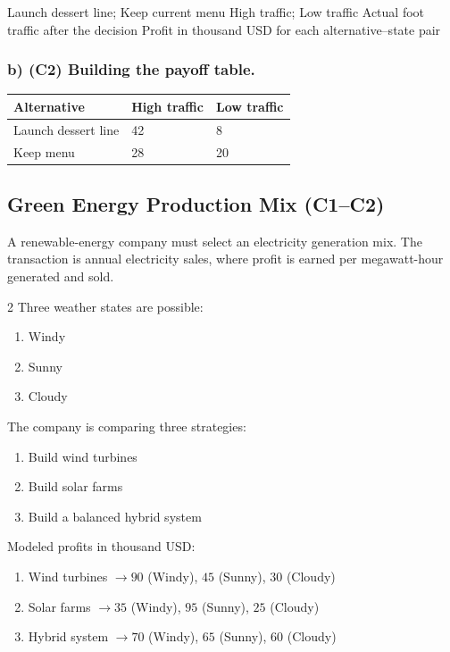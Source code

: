 	\DecisionElementsTable
	{Launch dessert line; Keep current menu}
	{High traffic; Low traffic}
	{Actual foot traffic after the decision}
	{Profit in thousand USD for each alternative--state pair}
	
	
	\subsubsection*{b) \textbf{(C2)} Building the payoff table.}
	\label{subsec:problem1-local-cafe-investment-c2}
	\begin{center}
		\begin{tabular}{lll}
			\toprule
			Alternative & High traffic & Low traffic \\
			\midrule
			Launch dessert line & 42 & 8 \\
			Keep menu & 28 & 20 \\
			\bottomrule
		\end{tabular}
	\end{center}
	
	
	\subsection{Green Energy Production Mix (C1--C2)}
	\label{sec:problem2-green-energy-production-mix-c1-c2}
	A renewable-energy company must select an electricity generation mix. The transaction is annual electricity sales, where profit is earned per megawatt-hour generated and sold.
	
	\begin{multicols}{2}
		Three weather states are possible:
		\begin{enumerate}[label=\arabic*.]
			\item Windy
			\item Sunny
			\item Cloudy
		\end{enumerate}
	
		The company is comparing three strategies:
		\begin{enumerate}[label=\arabic*.]
			\item Build wind turbines
			\item Build solar farms
			\item Build a balanced hybrid system
		\end{enumerate}
	
			\columnbreak
	
		Modeled profits in thousand USD:
		\begin{enumerate}[label=\arabic*.]
			\item Wind turbines $\to 90$ (Windy), $45$ (Sunny), $30$ (Cloudy)
			\item Solar farms $\to 35$ (Windy), $95$ (Sunny), $25$ (Cloudy)
			\item Hybrid system $\to 70$ (Windy), $65$ (Sunny), $60$ (Cloudy)
		\end{enumerate}
	\end{multicols}

